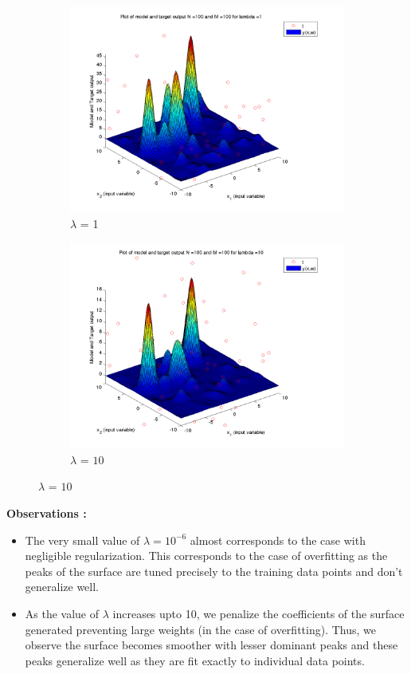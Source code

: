 \documentclass{article}
\begin{document}
\begin{figure}[H]
\begin{subfigure}{.5\textwidth}
\centering
\includegraphics[width=\linewidth]{D2/Varyinglambda_N100M100lambda1}
\caption{$\lambda$ = 1}
\end{subfigure}
\begin{subfigure}{.5\textwidth}
\includegraphics[width=\linewidth]{D2/Varyinglambda_N100M100lambda10}
\caption{$\lambda$ = $10$}
\end{subfigure}



\end{figure}


\textbf{Observations :}

\begin{itemize}
\item The very small value of $\lambda=10^{-6}$ almost corresponds to the case with negligible regularization. This corresponds to the case of overfitting as the peaks of the surface are tuned precisely to the training data points and don't generalize well.
\item As the value of $\lambda$ increases upto 10, we penalize the coefficients of the surface generated preventing large weights (in the case of overfitting). Thus, we observe the surface becomes smoother with lesser dominant peaks and these peaks generalize well as they are fit exactly to individual data points.
\end{itemize}
\end{document}
